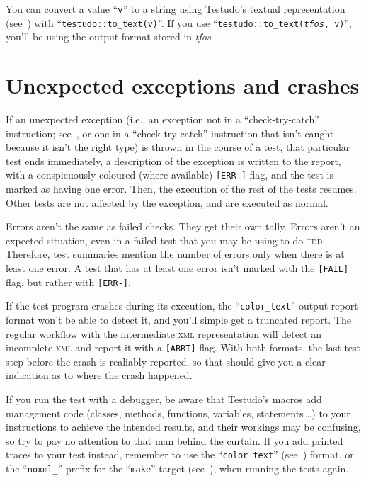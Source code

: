 \documentclass[twoside, a4paper, article]{memoir}
\newcommand\typesetexampleandreport[1]{%
  \typesetexamplesource{#1}
  \typesetexamplereport{#1}
}
\providecommand\typesetexamplereport[1]{%
}
\providecommand\typesetexamplesource[1]{%
}
\newcommand*\ellipsis{\,\ldots}
\begin{document}
You can convert a value ``\texttt{v}'' to a string using Testudo's textual
representation (see~) with
``\texttt{testudo::to\_text(v)}''.  If you use
``\texttt{testudo::to\_text(\textit{tfos}, v)}'', you'll be using the output
format stored in \emph{tfos}.

\typesetexampleandreport{tfos-to-text}


\section{Unexpected exceptions and crashes}
\label{sec:unexpected-exceptions-crashes}

If an unexpected exception (i.e., an exception not in a ``check-try-catch''
instruction; see~, or one in a ``check-try-catch''
instruction that isn't caught because it isn't the right type) is thrown in the
course of a test, that particular test ends immediately, a description of the
exception is written to the report, with a conspicuously coloured (where
available) \verb|[ERR-]| flag, and the test is marked as having one error.
Then, the execution of the rest of the tests resumes.  Other tests are not
affected by the exception, and are executed as normal.

\typesetexampleandreport{unexpected-exception}

Errors aren't the same as failed checks.  They get their own tally.  Errors
aren't an expected situation, even in a failed test that you may be using to do
\textsc{tdd}.  Therefore, test summaries mention the number of errors only
when there is at least one error.  A test that has at least one error isn't
marked with the \verb|[FAIL]| flag, but rather with \verb|[ERR-]|.

If the test program crashes during its execution, the ``\texttt{color\_text}''
output report format won't be able to detect it, and you'll simple get a
truncated report.  The regular workflow with the intermediate \textsc{xml}
representation will detect an incomplete \textsc{xml} and report it with a
\verb|[ABRT]| flag.  With both formats, the last test step before the crash is
realiably reported, so that should give you a clear indication as to where the
crash happened.

If you run the test with a debugger, be aware that Testudo's macros add
management code (classes, methods, functions, variables, statements\ellipsis{})
to your instructions to achieve the intended results, and their workings may be
confusing, so try to pay no attention to that man behind the curtain.  If you
add printed traces to your test instead, remember to use the
``\texttt{color\_text}'' (see~) format, or the
``\texttt{noxml\_}'' prefix for the ``\texttt{make}'' target
(see~), when running the tests again.
\end{document}
